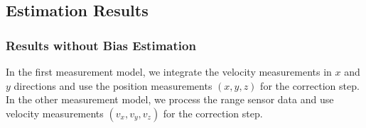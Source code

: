 \documentclass[letterpaper, 10 pt, conference]{ieeeconf}  %
\begin{document}
\newpage
\subsection{Estimation Results}
\subsubsection{Results without Bias Estimation }
In the first measurement model, we integrate the velocity measurements in $x$ and $y$ directions and use the position measurements $(x,y,z)$ for the correction step. In the other measurement model, we process the range sensor data and use velocity measurements $(v_x,v_y,v_z)$ for the correction step. 

\begin{figure}[ht]
	\centering
	  \\
	  \\
\end{figure}
\end{document}
